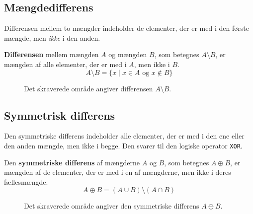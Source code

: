 \subsection*{Mængdedifferens}
Differensen mellem to mængder indeholder de elementer, der er med i den første mængde, men \textit{ikke} i den anden.

\begin{definition}[Mængdedifferens]
    \textbf{Differensen} mellem mængden $A$ og mængden $B$, som betegnes $A \setminus B$, er mængden af alle elementer, der er med i $A$, men ikke i $B$.
    \[ A \setminus B = \{ x \mid x \in A \text{ og } x \notin B \} \]
\end{definition}

\begin{figure}[htbp]
    \centering
    \caption{Det skraverede område angiver differensen $A \setminus B$.}
    \label{fig:difference_custom}
\end{figure}

\subsection*{Symmetrisk differens}
Den symmetriske differens indeholder alle elementer, der er med i den ene eller den anden mængde, men ikke i begge. Den svarer til den logiske operator \texttt{XOR}.

\begin{definition}
    Den \textbf{symmetriske differens} af mængderne $A$ og $B$, som betegnes $A \oplus B$, er mængden af de elementer, der er med i en af mængderne, men ikke i deres fællesmængde.
    \[ A \oplus B = (A \cup B) \setminus (A \cap B) \]
\end{definition}

\begin{figure}[htbp]
    \centering
    \caption{Det skraverede område angiver den symmetriske differens $A \oplus B$.}
    \label{fig:symmetric_difference_custom}
\end{figure}

